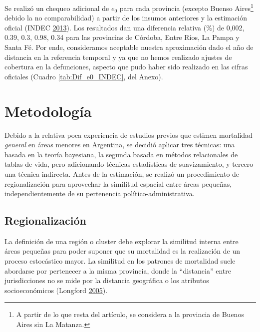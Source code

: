 \documentclass[12pt,spanish,]{article}
\begin{document}
Se realizó un chequeo adicional de \(e_0\) para cada provincia (excepto
Buenso Aires\footnote{A partir de lo que resta del artículo, se
  considera a la provincia de Buenos Aires sin La Matanza.} debido la no
comparabilidad) a partir de los insumos anteriores y la estimación
oficial (INDEC \protect\hyperlink{ref-INDEC2013}{2013}). Los resultados
dan una diferencia relativa (\%) de 0,002, 0.39, 0.3, 0.98, 0.34 para
las provincias de Córdoba, Entre Ríos, La Pampa y Santa Fé. Por ende,
consideramos aceptable nuestra aproximación dado el año de distancia en
la referencia temporal y ya que no hemos realizado ajustes de cobertura
en la defunciones, aspecto que pudo haber sido realizado en las cifras
oficiales (Cuadro \ref{tab:Dif_e0_INDEC}, del Anexo).

\hypertarget{metodologuxeda}{%
\section{Metodología}\label{metodologuxeda}}

Debido a la relativa poca experiencia de estudios previos que estimen
mortalidad \emph{general} en áreas menores en Argentina, se decidió
aplicar tres técnicas: una basada en la teoría bayesiana, la segunda
basada en métodos relacionales de tablas de vida, pero adicionando
técnicas estadísticas de suavizamiento, y tercero una técnica indirecta.
Antes de la estimación, se realizó un procedimiento de regionalización
para aprovechar la similitud espacial entre áreas pequeñas,
independientemente de su pertenencia político-administrativa.

\hypertarget{regionalizaciuxf3n}{%
\subsection{Regionalización}\label{regionalizaciuxf3n}}

La definición de una región o cluster debe explorar la similitud interna
entre áreas pequeñas para poder suponer que su mortalidad es la
realización de un proceso estocástico mayor. La similitud en los
patrones de mortalidad suele abordarse por pertenecer a la misma
provincia, donde la ``distancia'' entre jurisdicciones no se mide por la
distancia geográfica o los atributos socioeconómicos (Longford
\protect\hyperlink{ref-Longford2005}{2005}).
\end{document}
